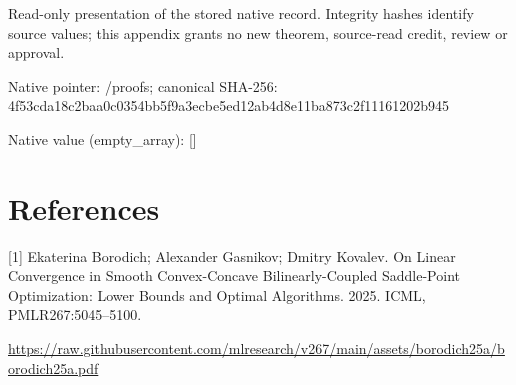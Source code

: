 \documentclass[10pt,a4paper]{article}
\begin{document}
Read-only presentation of the stored native record. Integrity hashes identify source values; this appendix grants no new theorem, source-read credit, review or approval.



Native pointer: /proofs; canonical SHA-256: 4f53cda18c2baa0c0354bb5f\allowbreak{}9a3ecbe5ed12ab4d8e11ba87\allowbreak{}3c2f11161202b945



Native value (empty\_array): []



\section{References}


[1] Ekaterina Borodich; Alexander Gasnikov; Dmitry Kovalev. On Linear Convergence in Smooth Convex-Concave Bilinearly-Coupled Saddle-Point Optimization: Lower Bounds and Optimal Algorithms. 2025. ICML, PMLR267:5045--5100.



\url{https://raw.githubusercontent.com/mlresearch/v267/main/assets/borodich25a/borodich25a.pdf}
\end{document}
